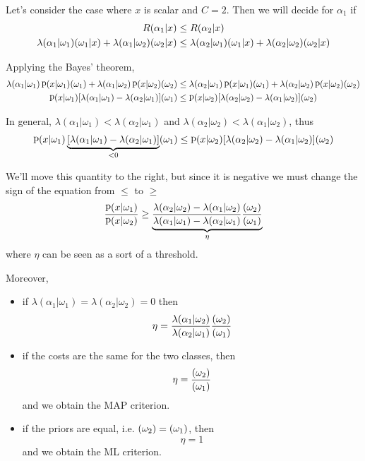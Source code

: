 \documentclass[oneside,onecolumn]{report}
\DeclareMathOperator*{\pdf}{p}
\let\P\relax
\DeclareMathOperator*{\P}{P}
\begin{document}
Let's consider the case where $x$ is scalar and $C = 2$.
Then we will decide for $\alpha_1$ if
\begin{gather*}
    R(\alpha_1 | x) \leq R(\alpha_2 | x) \\
    \lambda(\alpha_1 | \omega_1) \P(\omega_1 | x) + \lambda(\alpha_1 | \omega_2) \P(\omega_2 | x) \leq \lambda(\alpha_2 | \omega_1) \P(\omega_1 | x) + \lambda(\alpha_2 | \omega_2) \P(\omega_2 | x)
\end{gather*}

Applying the Bayes' theorem,
\begin{gather*}
        \lambda(\alpha_1 | \omega_1) \pdf(x | \omega_1) \P(\omega_1) + \lambda(\alpha_1 | \omega_2) \pdf(x | \omega_2) \P(\omega_2) \leq \lambda(\alpha_2 | \omega_1) \pdf(x | \omega_1) \P(\omega_1) + \lambda(\alpha_2 | \omega_2) \pdf(x | \omega_2) \P(\omega_2) \\
        \pdf(x | \omega_1) [\lambda(\alpha_1 | \omega_1) - \lambda(\alpha_2 | \omega_1)] \P(\omega_1) \leq \pdf(x | \omega_2) [\lambda(\alpha_2 | \omega_2) - \lambda(\alpha_1 | \omega_2)] \P(\omega_2)
\end{gather*}

In general, $\lambda(\alpha_1|\omega_1) < \lambda(\alpha_2|\omega_1)$ and $\lambda(\alpha_2|\omega_2) < \lambda(\alpha_1|\omega_2)$, thus
$$  \pdf(x | \omega_1) \underbrace{[\lambda(\alpha_1 | \omega_1) - \lambda(\alpha_2 | \omega_1)]}_{< 0} \P(\omega_1) \leq \pdf(x | \omega_2) [\lambda(\alpha_2 | \omega_2) - \lambda(\alpha_1 | \omega_2)] \P(\omega_2) $$

We'll move this quantity to the right, but since it is negative we must change the sign of the equation from $\leq$ to $\geq$
$$ \frac{\pdf(x | \omega_1)}{\pdf(x | \omega_2)} \geq \underbrace{\frac{\lambda(\alpha_2 | \omega_2) - \lambda(\alpha_1 | \omega_2)}{\lambda(\alpha_1 | \omega_1) - \lambda(\alpha_2 | \omega_1)} \frac{\P(\omega_2)}{\P(\omega_1)}}_\eta $$
where $\eta$ can be seen as a sort of a threshold.

Moreover,
\begin{itemize}
    \item if $\lambda(\alpha_1|\omega_1) = \lambda(\alpha_2|\omega_2) = 0$ then
    $$ \eta = \frac{\lambda(\alpha_1 | \omega_2)}{\lambda(\alpha_2 | \omega_1)} \frac{\P(\omega_2)}{\P(\omega_1)} $$

    \item if the costs are the same for the two classes, then
    $$ \eta = \frac{\P(\omega_2)}{\P(\omega_1)} $$
    and we obtain the MAP criterion.

    \item if the priors are equal, i.e. $\P(\omega_2) = \P(\omega_1)$, then
    $$ \eta = 1 $$
    and we obtain the ML criterion.
\end{itemize}
\end{document}
